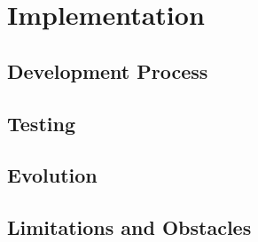 \chapter{Implementation}
\section{Development Process}
\section{Testing}
\section{Evolution}
\section{Limitations and Obstacles}
